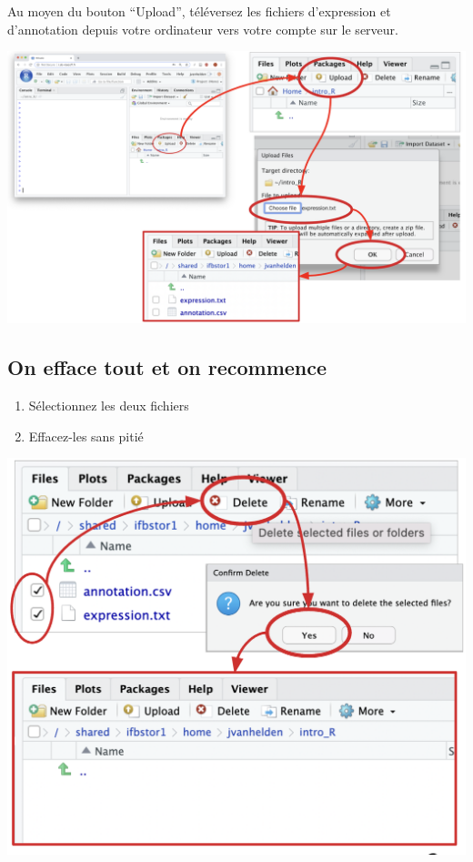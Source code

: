 \documentclass[
]{book}
\providecommand{\tightlist}{%
  \setlength{\itemsep}{0pt}\setlength{\parskip}{0pt}}
\begin{document}
Au moyen du bouton ``Upload'', téléversez les fichiers d'expression et d'annotation depuis votre ordinateur vers votre compte sur le serveur.

\includegraphics{images/uploadData.png}

\hypertarget{on-efface-tout-et-on-recommence}{%
\subsection{On efface tout et on recommence}\label{on-efface-tout-et-on-recommence}}

\begin{enumerate}
\def\labelenumi{\arabic{enumi}.}
\tightlist
\item
  Sélectionnez les deux fichiers
\item
  Effacez-les sans pitié
\end{enumerate}

\includegraphics{images/delete.png}
\end{document}
